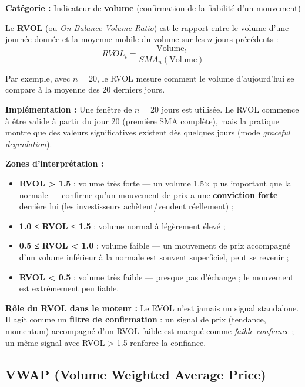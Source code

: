 \documentclass{rapportENSIAS} %
\begin{document}
\vspace{0.2cm}
\noindent
\textbf{Catégorie :} Indicateur de \textbf{volume} (confirmation de la fiabilité d'un mouvement)

\vspace{0.2cm}
\noindent
Le \textbf{RVOL} (ou \textit{On-Balance Volume Ratio}) est le rapport entre le volume d'une journée donnée et la moyenne mobile du volume sur les $n$ jours précédents :
\[
RVOL_t = \frac{\text{Volume}_{t}}{SMA_{n}(\text{Volume})}
\]

\noindent
Par exemple, avec $n=20$, le RVOL mesure comment le volume d'aujourd'hui se compare à la moyenne des 20 derniers jours.

\vspace{0.2cm}
\noindent
\textbf{Implémentation :} Une fenêtre de $n = 20$ jours est utilisée. Le RVOL commence à être valide à partir du jour 20 (première SMA complète), mais la pratique montre que des valeurs significatives existent dès quelques jours (mode \textit{graceful degradation}).

\vspace{0.2cm}
\noindent
\textbf{Zones d'interprétation :}
\begin{itemize}
    \item \textbf{RVOL > 1.5} : volume très forte — un volume 1.5× plus important que la normale — confirme qu'un mouvement de prix a une \textbf{conviction forte} derrière lui (les investisseurs achètent/vendent réellement) ;
    \item \textbf{1.0 ≤ RVOL ≤ 1.5} : volume normal à légèrement élevé ;
    \item \textbf{0.5 ≤ RVOL < 1.0} : volume faible — un mouvement de prix accompagné d'un volume inférieur à la normale est souvent superficiel, peut se revenir ;
    \item \textbf{RVOL < 0.5} : volume très faible — presque pas d'échange ; le mouvement est extrêmement peu fiable.
\end{itemize}

\noindent
\textbf{Rôle du RVOL dans le moteur :} Le RVOL n'est jamais un signal standalone. Il agit comme un \textbf{filtre de confirmation} : un signal de prix (tendance, momentum) accompagné d'un RVOL faible est marqué comme \textit{faible confiance} ; un même signal avec RVOL > 1.5 renforce la confiance.

\subsection{VWAP (Volume Weighted Average Price)}
\end{document}
